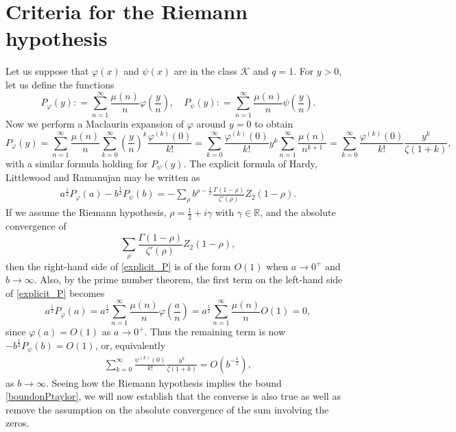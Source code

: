 \documentclass[11pt]{article}
\newcommand{\R}{\mathbb{R}}
\numberwithin{equation}{section}		 			%
\numberwithin{figure}{section}			 			%
\begin{document}
\section{Criteria for the Riemann hypothesis}
\noindent Let us suppose that $\varphi(x)$ and $\psi(x)$ are in the class $\mathcal{K}$ and $q=1$. For $y>0$, let us define the functions
\[{P_\varphi }(y): = \sum\limits_{n = 1}^\infty  {\frac{{\mu (n)}}{n}\varphi \left( {\frac{y}{n}} \right)} ,\quad {P_\psi }(y): = \sum\limits_{n = 1}^\infty  {\frac{{\mu (n)}}{n}\psi \left( {\frac{y}{n}} \right)}. \]
Now we perform a Maclaurin expansion of $\varphi$ around $y=0$ to obtain
\[{P_\varphi }(y) = \sum\limits_{n = 1}^\infty  {\frac{{\mu (n)}}{n}\sum\limits_{k = 0}^\infty  {{{\left( {\frac{y}{n}} \right)}^k}} \frac{{{\varphi ^{(k)}}(0)}}{{k!}}}  = \sum\limits_{k = 0}^\infty  {\frac{{{\varphi ^{(k)}}(0)}}{{k!}}{y^k}\sum\limits_{n = 1}^\infty  {\frac{{\mu (n)}}{{{n^{k + 1}}}}} }  = \sum\limits_{k = 0}^\infty  {\frac{{{\varphi ^{(k)}}(0)}}{{k!}}\frac{{{y^k}}}{{\zeta (1 + k)}}}, \]
with a similar formula holding for ${P_\psi }(y)$. The explicit formula of Hardy, Littlewood and Ramanujan may be written as
\begin{align} \label{explicit_P}
{a^{\tfrac{1}{2}}}{P_\varphi }(a) - {b^{\tfrac{1}{2}}}{P_\psi }(b) =  -\sum\limits_\rho  {{b^{\rho -\tfrac{1}{2}}}\frac{{\Gamma (1 - \rho )}}{{\zeta '(\rho )}}{Z_2}(1 - \rho )}.
\end{align}
If we assume the Riemann hypothesis, $\rho= \tfrac{1}{2} + i \gamma$ with $\gamma \in \R$, and the absolute convergence of
\[\sum\limits_\rho  {\frac{{\Gamma (1 - \rho )}}{{\zeta '(\rho )}}{Z_2}(1 - \rho )}, \]
then the right-hand side of \eqref{explicit_P} is of the form $O(1)$ when $a \to 0^+$ and $b \to \infty$. Also, by the prime number theorem, the first term on the left-hand side of \eqref{explicit_P} becomes
\[{a^{\tfrac{1}{2}}}{P_\varphi }(a) = {a^{\tfrac{1}{2}}}\sum\limits_{n = 1}^\infty  {\frac{{\mu (n)}}{n}\varphi \left( {\frac{a}{n}} \right)}  = {a^{\tfrac{1}{2}}}\sum\limits_{n = 1}^\infty  {\frac{{\mu (n)}}{n}O(1)}  = 0,\]
since $\varphi(a) = O(1)$ as $a \to 0^+$. Thus the remaining term is now $- {b^{\tfrac{1}{2}}}{P_\psi}(b) = O(1)$, or, equivalently
\begin{align} \label{boundonPtaylor}
\sum\limits_{k = 0}^\infty  {\frac{{{\psi ^{(k)}}(0)}}{{k!}}\frac{{{b^k}}}{{\zeta (1 + k)}}}  = O({b^{ - \tfrac{1}{2}}}),
\end{align}
as $b \to \infty$. Seeing how the Riemann hypothesis implies the bound \eqref{boundonPtaylor}, we will now establish that the converse is also true as well as remove the assumption on the absolute convergence of the sum involving the zeros.
\end{document}
